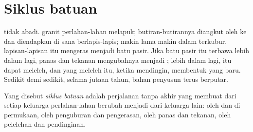 \section{Siklus batuan}

 tidak abadi.  granit perlahan-lahan melapuk; butiran-butirannya
diangkut oleh  ke  dan diendapkan di sana berlapis-lapis; makin
lama makin dalam terkubur, lapisan-lapisan itu mengeras menjadi batu pasir.
Jika batu pasir itu terbawa lebih dalam lagi, panas dan tekanan mengubahnya
menjadi ; lebih dalam lagi,  itu dapat meleleh, dan
 yang meleleh itu, ketika mendingin, membentuk  yang baru.
Sedikit demi sedikit, selama jutaan tahun, bahan penyusun  terus
berputar.

\begin{definition}\label{def:g6:rocks-and-minerals:rock-cycle}
Yang disebut \emph{siklus batuan} adalah perjalanan tanpa
akhir yang membuat  dari setiap keluarga perlahan-lahan berubah
menjadi  dari keluarga lain: oleh  dan  di permukaan,
oleh penguburan dan pengerasan, oleh panas dan tekanan, oleh pelelehan dan
pendinginan.
\end{definition}

